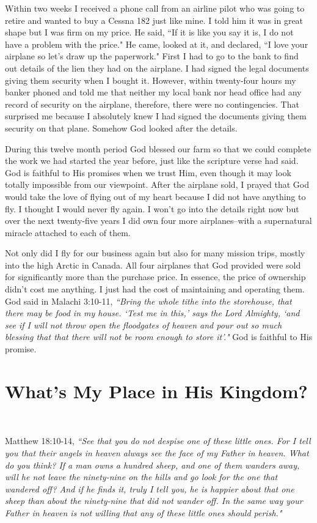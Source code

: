 \documentclass[oneside,12pt]{book}
\begin{document}
Within two weeks I received a phone call from an airline pilot who was going to retire and wanted to buy a Cessna 182 just like mine. I told him it was in great shape but I was firm on my price. He said, ``If it is like you say it is, I do not have a problem with the price." He came, looked at it, and declared, ``I love your airplane so let's draw up the paperwork." First I had to go to the bank to find out details of the lien they had on the airplane. I had signed the legal documents giving them security when I bought it. However, within twenty-four hours my banker phoned and told me that neither my local bank nor head office had any record of security on the airplane, therefore, there were no contingencies. That surprised me because I absolutely knew I had signed the documents giving them security on that plane. Somehow God looked after the details.

During this twelve month period God blessed our farm so that we could complete the work we had started the year before, just like the scripture verse had said. God is faithful to His promises when we trust Him, even though it may look totally impossible from our viewpoint. After the airplane sold, I prayed that God would take the love of flying out of my heart because I did not have anything to fly. I thought I would never fly again. I won't go into the details right now but over the next twenty-five years I did own four more airplanes--with a supernatural miracle attached to each of them. 

Not only did I fly for our business again but also for many mission trips, mostly into the high Arctic in Canada. All four airplanes that God provided were sold for significantly more than the purchase price. In essence, the price of ownership didn't cost me anything. I just had the cost of maintaining and operating them. God said in Malachi 3:10-11, \textit{``Bring the whole tithe into the storehouse, that there may be food in my house. `Test me in this,' says the Lord Almighty, `and see if I will not throw open the floodgates of heaven and pour out so much blessing that that there will not be room enough to store it'."} God is faithful to His promise.


\chapter{What's My Place in His Kingdom?}
\

Matthew 18:10-14, \textit{``See that you do not despise one of these little ones. For I tell you that their angels in heaven always see the face of my Father in heaven. What do you think? If a man owns a hundred sheep, and one of them wanders away, will he not leave the ninety-nine on the hills and go look for the one that wandered off? And if he finds it, truly I tell you, he is happier about that one sheep than about the ninety-nine that did not wander off. In the same way your Father in heaven is not willing that any of these little ones should perish."}
\end{document}
